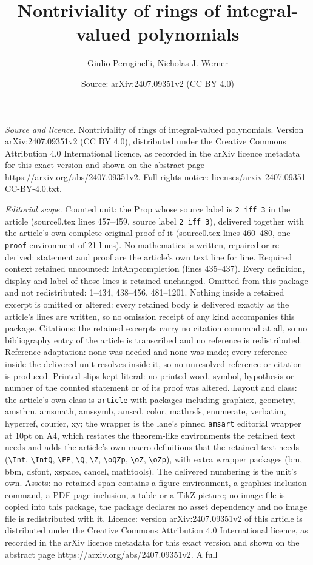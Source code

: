 \documentclass[10pt,a4paper]{amsart}
\title[Nontriviality of rings of integral-valued polynomials]{Nontriviality of rings of integral-valued polynomials}
\author{Giulio Peruginelli, Nicholas J. Werner}
\date{Source: arXiv:2407.09351v2 (CC BY 4.0)}
\begin{document}
\maketitle

\noindent\emph{Source and licence.} Nontriviality of rings of integral-valued polynomials. Version arXiv:2407.09351v2 (CC BY 4.0), distributed under the Creative Commons Attribution 4.0 International licence, as recorded in the arXiv licence metadata for this exact version and shown on the abstract page https://arxiv.org/abs/2407.09351v2. Full rights notice: licenses/arxiv-2407.09351-CC-BY-4.0.txt.\par\smallskip

\noindent\textit{Editorial scope.} Counted unit: the Prop whose source label is \texttt{2 iff 3} in the article (source0.tex lines 457--459, source label \texttt{2 iff 3}), delivered together with the article's own complete original proof of it (source0.tex lines 460--480, one \texttt{proof} environment of 21 lines). No mathematics is written, repaired or re-derived: statement and proof are the article's own text line for line. Required context retained uncounted: IntAnpcompletion (lines 435--437). Every definition, display and label of those lines is retained unchanged. Omitted from this package and not redistributed: 1--434, 438--456, 481--1201. Nothing inside a retained excerpt is omitted or altered: every retained body is delivered exactly as the article's lines are written, so no omission receipt of any kind accompanies this package. Citations: the retained excerpts carry no citation command at all, so no bibliography entry of the article is transcribed and no reference is redistributed. Reference adaptation: none was needed and none was made; every reference inside the delivered unit resolves inside it, so no unresolved reference or citation is produced. Printed slips kept literal: no printed word, symbol, hypothesis or number of the counted statement or of its proof was altered. Layout and class: the article's own class is \texttt{article} with packages including graphicx, geometry, amsthm, amsmath, amssymb, amscd, color, mathrsfs, enumerate, verbatim, hyperref, courier, xy; the wrapper is the lane's pinned \texttt{amsart} editorial wrapper at 10pt on A4, which restates the theorem-like environments the retained text needs and adds the article's own macro definitions that the retained text needs (\texttt{\textbackslash Int}, \texttt{\textbackslash IntQ}, \texttt{\textbackslash PP}, \texttt{\textbackslash Q}, \texttt{\textbackslash Z}, \texttt{\textbackslash oQZp}, \texttt{\textbackslash oZ}, \texttt{\textbackslash oZp}), with extra wrapper packages (bm, bbm, dsfont, xspace, cancel, mathtools). The delivered numbering is the unit's own. Assets: no retained span contains a figure environment, a graphics-inclusion command, a PDF-page inclusion, a table or a TikZ picture; no image file is copied into this package, the package declares no asset dependency and no image file is redistributed with it. Licence: version arXiv:2407.09351v2 of this article is distributed under the Creative Commons Attribution 4.0 International licence, as recorded in the arXiv licence metadata for this exact version and shown on the abstract page https://arxiv.org/abs/2407.09351v2. A full 
\end{document}
